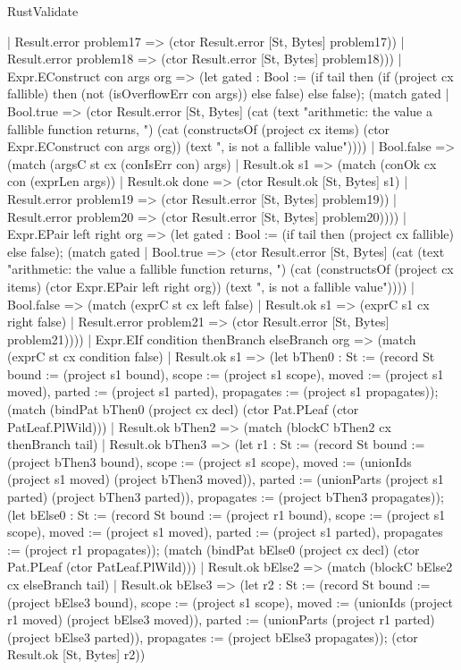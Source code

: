 \begin{lexlean}{RustValidate}
\begin{semanticmodule}
{          | Result.error problem17 => (ctor Result.error [St, Bytes] problem17))
        | Result.error problem18 => (ctor Result.error [St, Bytes] problem18)))
    | Expr.EConstruct con args org => (let gated : Bool := (if tail then (if (project cx fallible) then (not (isOverflowErr con args)) else false) else false); (match gated
      | Bool.true => (ctor Result.error [St, Bytes] (cat (text "arithmetic: the value a fallible function returns, ") (cat (constructsOf (project cx items) (ctor Expr.EConstruct con args org)) (text ", is not a fallible value"))))
      | Bool.false => (match (argsC st cx (conIsErr con) args)
        | Result.ok s1 => (match (conOk cx con (exprLen args))
          | Result.ok done => (ctor Result.ok [St, Bytes] s1)
          | Result.error problem19 => (ctor Result.error [St, Bytes] problem19))
        | Result.error problem20 => (ctor Result.error [St, Bytes] problem20))))
    | Expr.EPair left right org => (let gated : Bool := (if tail then (project cx fallible) else false); (match gated
      | Bool.true => (ctor Result.error [St, Bytes] (cat (text "arithmetic: the value a fallible function returns, ") (cat (constructsOf (project cx items) (ctor Expr.EPair left right org)) (text ", is not a fallible value"))))
      | Bool.false => (match (exprC st cx left false)
        | Result.ok s1 => (exprC s1 cx right false)
        | Result.error problem21 => (ctor Result.error [St, Bytes] problem21))))
    | Expr.EIf condition thenBranch elseBranch org => (match (exprC st cx condition false)
      | Result.ok s1 => (let bThen0 : St := (record St {bound := (project s1 bound), scope := (project s1 scope), moved := (project s1 moved), parted := (project s1 parted), propagates := (project s1 propagates)}); (match (bindPat bThen0 (project cx decl) (ctor Pat.PLeaf (ctor PatLeaf.PlWild)))
        | Result.ok bThen2 => (match (blockC bThen2 cx thenBranch tail)
          | Result.ok bThen3 => (let r1 : St := (record St {bound := (project bThen3 bound), scope := (project s1 scope), moved := (unionIds (project s1 moved) (project bThen3 moved)), parted := (unionParts (project s1 parted) (project bThen3 parted)), propagates := (project bThen3 propagates)}); (let bElse0 : St := (record St {bound := (project r1 bound), scope := (project s1 scope), moved := (project s1 moved), parted := (project s1 parted), propagates := (project r1 propagates)}); (match (bindPat bElse0 (project cx decl) (ctor Pat.PLeaf (ctor PatLeaf.PlWild)))
            | Result.ok bElse2 => (match (blockC bElse2 cx elseBranch tail)
              | Result.ok bElse3 => (let r2 : St := (record St {bound := (project bElse3 bound), scope := (project s1 scope), moved := (unionIds (project r1 moved) (project bElse3 moved)), parted := (unionParts (project r1 parted) (project bElse3 parted)), propagates := (project bElse3 propagates)}); (ctor Result.ok [St, Bytes] r2))
}
\end{semanticmodule}
\end{lexlean}
